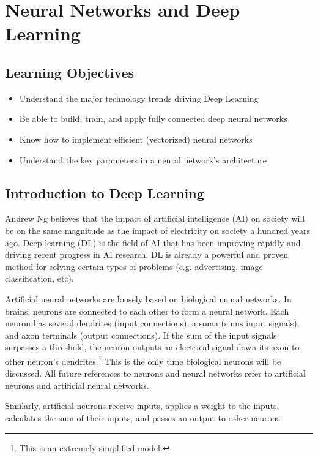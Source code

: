\chapter{Neural Networks and Deep Learning}
\section*{Learning Objectives}
\begin{itemize}
  \item Understand the major technology trends driving Deep Learning
  \item Be able to build, train, and apply fully connected deep neural networks
  \item Know how to implement efficient (vectorized) neural networks
  \item Understand the key parameters in a neural network's architecture
\end{itemize}

\section{Introduction to Deep Learning}
Andrew Ng believes that the impact of artificial intelligence (AI) on society will be on the same magnitude as the impact of electricity on society a hundred years ago. Deep learning (DL) is the field of AI that has been improving rapidly and driving recent progress in AI research. DL is already a powerful and proven method for solving certain types of problems (e.g. advertising, image classification, etc). 

Artificial neural networks are loosely based on biological neural networks. In brains, neurons are connected to each other to form a neural network. Each neuron has several dendrites (input connections), a soma (sums input signals), and axon terminals (output connections). If the sum of the input signals surpasses a threshold, the neuron outputs an electrical signal down its axon to other neuron's dendrites.\footnote{This is an extremely simplified model.} This is the only time biological neurons will be discussed. All future references to neurons and neural networks refer to artificial neurons and artificial neural networks.

Similarly, artificial neurons receive inputs, applies a weight to the inputs, calculates the sum of their inputs, and passes an output to other neurons.

